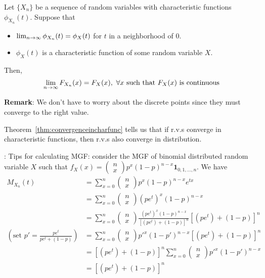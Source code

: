 \documentclass[11pt]{article}
\begin{document}
\begin{theorem}\label{thm:convergenceincharfunc}
	Let $\{X_n \}$ be a sequence of random  variables with characteristic functions $\phi_{X_n}(t)$. Suppose that
	\begin{itemize}
		\item $\lim_{n\rightarrow\infty}\phi_{X_n}(t) = \phi_X(t)$ for $t$ in a neighborhood of 0.
		\item $\phi_X(t)$ is a characteristic function of some random variable $X$.
	\end{itemize}
	Then,
	$$\limn F_{X_n}(x) = F_X(x),\ \forall x\mbox{ such that $F_X(x)\mbox{ is continuous}$}$$
\end{theorem}
{\bf Remark}: We don't have to worry about the discrete points since they must converge to the right value.\\

\begin{intuition}
	Theorem~\ref{thm:convergenceincharfunc} tells us that if r.v.s converge in characteristic functions, then r.v.s also converge in distribution.
\end{intuition}

: Tips for calculating MGF: consider the MGF of binomial distributed random variable $X$ such that $f_X(x)=\left(\begin{array}{c}
n\\
x
\end{array}\right)p^{x}(1-p)^{n-x}\mathbf{1}_{0,1,...,n}$. We have
\begin{align*}
M_{X_n}(t) &= \sum_{x=0}^n\left(\begin{array}{c}
n\\
x
\end{array}\right)p^{x}(1-p)^{n-x}e^{tx}\\
&=\sum_{x=0}^n\left(\begin{array}{c}
n\\
x
\end{array}\right)(pe^t)^x(1-p)^{n-x}\\
&=\sum_{x=0}^n\left(\begin{array}{c}
n\\
x
\end{array}\right)\frac{(pe^t)^x(1-p)^{n-x}}{[(pe^t)+(1-p)]^n}[(pe^t)+(1-p)]^n\\
(\mbox{set }p'=\frac{pe^t}{pe^t+(1-p)})&=\sum_{x=0}^n\left(\begin{array}{c}
n\\
x
\end{array}\right)p'^x(1-p')^{n-x}[(pe^t)+(1-p)]^n\\
&=[(pe^t)+(1-p)]^n\sum_{x=0}^n\left(\begin{array}{c}
n\\
x
\end{array}\right)p'^x(1-p')^{n-x}\\
&=[(pe^t)+(1-p)]^n
\end{align*}
\end{document}
